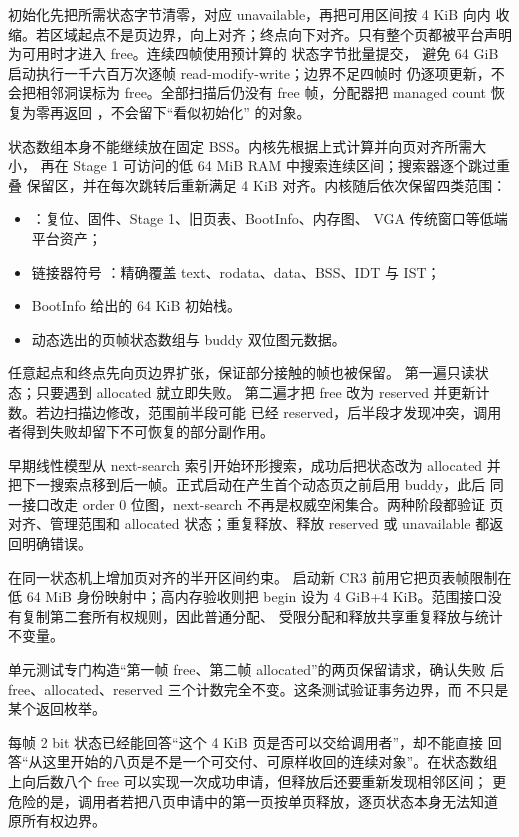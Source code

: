 初始化先把所需状态字节清零，对应 unavailable，再把可用区间按 4 KiB 向内
收缩。若区域起点不是页边界，向上对齐；终点向下对齐。只有整个页都被平台声明
为可用时才进入 free。连续四帧使用预计算的  状态字节批量提交，
避免 64 GiB 启动执行一千六百万次逐帧 read-modify-write；边界不足四帧时
仍逐项更新，不会把相邻洞误标为 free。全部扫描后仍没有 free 帧，分配器把
managed count 恢复为零再返回 ，不会留下“看似初始化”
的对象。

状态数组本身不能继续放在固定 BSS。内核先根据上式计算并向页对齐所需大小，
再在 Stage 1 可访问的低 64 MiB RAM 中搜索连续区间；搜索器逐个跳过重叠
保留区，并在每次跳转后重新满足 4 KiB 对齐。内核随后依次保留四类范围：

\begin{itemize}
  \item \code{[0,1 MiB)}：复位、固件、Stage 1、旧页表、BootInfo、内存图、
        VGA 传统窗口等低端平台资产；
  \item 链接器符号 ：精确覆盖
        text、rodata、data、BSS、IDT 与 IST；
  \item BootInfo 给出的 64 KiB 初始栈。
  \item 动态选出的页帧状态数组与 buddy 双位图元数据。
\end{itemize}

任意起点和终点先向页边界扩张，保证部分接触的帧也被保留。
 第一遍只读状态；只要遇到 allocated 就立即失败。
第二遍才把 free 改为 reserved 并更新计数。若边扫描边修改，范围前半段可能
已经 reserved，后半段才发现冲突，调用者得到失败却留下不可恢复的部分副作用。

早期线性模型从 next-search 索引开始环形搜索，成功后把状态改为 allocated
并把下一搜索点移到后一帧。正式启动在产生首个动态页之前启用 buddy，此后
同一接口改走 order 0 位图，next-search 不再是权威空闲集合。两种阶段都验证
页对齐、管理范围和 allocated 状态；重复释放、释放 reserved 或 unavailable
都返回明确错误。

 在同一状态机上增加页对齐的半开区间约束。
启动新 CR3 前用它把页表帧限制在低 64 MiB 身份映射中；高内存验收则把
begin 设为 4 GiB+4 KiB。范围接口没有复制第二套所有权规则，因此普通分配、
受限分配和释放共享重复释放与统计不变量。

单元测试专门构造“第一帧 free、第二帧 allocated”的两页保留请求，确认失败
后 free、allocated、reserved 三个计数完全不变。这条测试验证事务边界，而
不只是某个返回枚举。

每帧 2 bit 状态已经能回答“这个 4 KiB 页是否可以交给调用者”，却不能直接
回答“从这里开始的八页是不是一个可交付、可原样收回的连续对象”。在状态数组
上向后数八个 free 可以实现一次成功申请，但释放后还要重新发现相邻区间；
更危险的是，调用者若把八页申请中的第一页按单页释放，逐页状态本身无法知道
原所有权边界。

